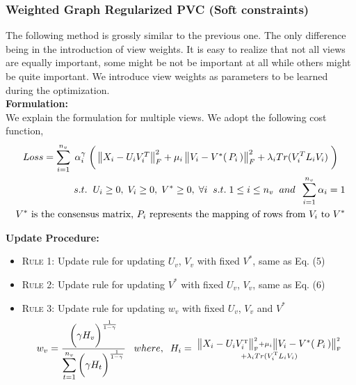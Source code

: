 \documentclass[a4paper]{article}
\begin{document}
	\subsubsection{Weighted Graph Regularized PVC (Soft constraints)}
	
	The following method is grossly similar to the previous one. The only difference being in the introduction of view weights. It is easy to realize that not all views are equally important, some might be not be important at all while others might be quite important. We introduce view weights as parameters to be learned during the optimization.\\	
	
	\noindent	
	\textbf{Formulation:}\\
	We explain the formulation for multiple views. We adopt the following cost function,
	\begin{multline}
	Loss = \displaystyle\sum_{i=1}^{n_{v}} \; \alpha_{i}^{\gamma} \; 
		\bigg(\begin{Vmatrix} X_{i}-U_{i}V^{T}_{i} \end{Vmatrix}^{2}_{F}	
		+ \mu_{i}\begin{Vmatrix} V_{i}-V^{*}(\, P_{i} \, ) \end{Vmatrix}^{2}_{F}
		+ \lambda_{i}Tr(V^{T}_{i}L_{i}V_{i}) \; \bigg) \\	
		\hfill s.t. \hspace{2mm}  U_{i}\geq0,\;V_{i}\geq0,\;V^{*}\geq0,\;\forall i \;\;s.t.\; 1 \leq i \leq n_{v}
		\;\; and \;\; \sum_{i=1}^{n_{v}} \alpha_{i} = 1 \\
		\hfill V^{*} \text{ is the consensus matrix, }
		P_{i} \text{ represents the mapping of rows from } V_{i} \text{ to } V^{*}
	\end{multline}
	
	\noindent
	\textbf{Update Procedure:}
	\begin{itemize}
		\item \textsc{Rule 1:}	Update rule for updating $U_{v}$, ${V_{v}}$ with fixed $V^{*}$, same as Eq. (5)
		\item \textsc{Rule 2:}	Update rule for updating $V^{*}$ with fixed $U_{v}$, ${V_{v}}$, same as Eq. (6) 
		\item \textsc{Rule 3:}	Update rule for updating $w_{v}$ with fixed $U_{v}$, ${V_{v}}$ and $V^{*}$ 
			\begin{multline}
			w_{v} = \frac{ \bigg( \gamma H_{v} \bigg)^{\frac{1}{1-\gamma}}}
			{\displaystyle \sum_{t=1}^{n_{v}}
			\bigg( \gamma H_{t} \bigg)^{\frac{1}{1-\gamma}}} \;\;\;
			where, \;\; H_{i} = \; \substack { \begin{Vmatrix} X_{i}-U_{i}V^{\text{\tiny{T}}}_{i}
			 \end{Vmatrix}^{\text{\tiny{2}}}_{\text{\tiny{F}}} + \mu_{i}\begin{Vmatrix} V_{i}-V^{*}(\, P_{i} \, ) 
			 \end{Vmatrix}^{\text{\tiny{2}}}_{\text{\tiny{F}}} \\
			+ \lambda_{i}Tr(V^{\text{\tiny{T}}}_{i}L_{i}V_{i}) }\\
			\end{multline}
	\end{itemize}		
	
\end{document}
